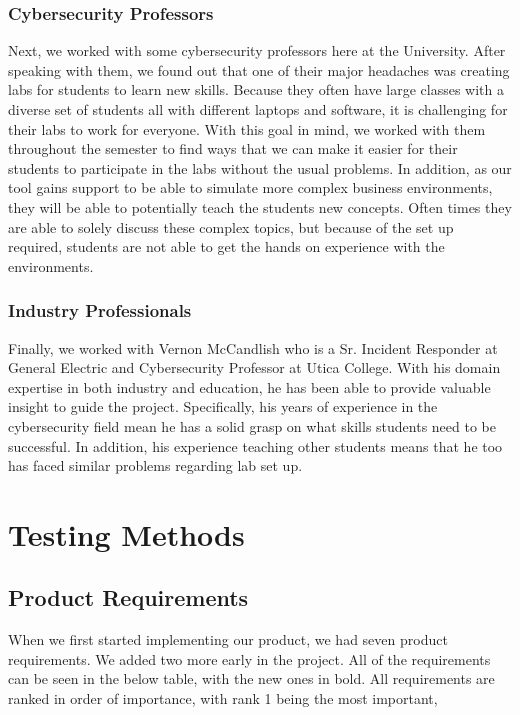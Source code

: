 \documentclass[openright]{report}
\begin{document}
\subsection{Cybersecurity Professors}

\par Next, we worked with some cybersecurity professors here at the University. After speaking with them, we found out that one of their major headaches was creating labs for students to learn new skills. Because they often have large classes with a diverse set of students all with different laptops and software, it is challenging for their labs to work for everyone\cite{ibrahiminterview}. With this goal in mind, we worked with them throughout the semester to find ways that we can make it easier for their students to participate in the labs without the usual problems. In addition, as our tool gains support to be able to simulate more complex business environments, they will be able to potentially teach the students new concepts. Often times they are able to solely discuss these complex topics, but because of the set up required, students are not able to get the hands on experience with the environments.

\subsection{Industry Professionals}

\par Finally, we worked with Vernon McCandlish who is a Sr. Incident Responder at General Electric and Cybersecurity Professor at Utica College. With his domain expertise in both industry and education, he has been able to provide valuable insight to guide the project. Specifically, his years of experience in the cybersecurity field mean he has a solid grasp on what skills students need to be successful. In addition, his experience teaching other students means that he too has faced similar problems regarding lab set up.


\chapter{Testing Methods}

\section{Product Requirements}

\par When we first started implementing our product, we had seven product requirements. We added two more early in the project. All of the requirements can be seen in the below table, with the new ones in bold. All requirements are ranked in order of importance, with rank 1 being the most important,
\end{document}
